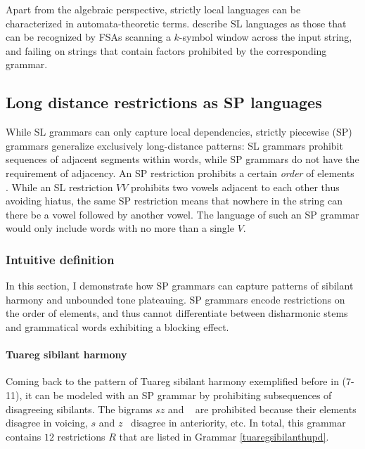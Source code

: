 Apart from the algebraic perspective, strictly local languages can be characterized in automata-theoretic terms.
\cite{RogersPullum2011} describe SL languages as those that can be recognized by FSAs scanning a $k$-symbol window across the input string, and failing on strings that contain factors prohibited by the corresponding grammar.


\subsection{Long distance restrictions as SP languages}
\label{SPldrestrictions}


While SL grammars can only capture local dependencies, strictly piecewise (SP) grammars generalize exclusively long-distance patterns: %
SL grammars prohibit sequences of adjacent segments within words, while SP grammars do not have the requirement of adjacency.
An SP restriction prohibits a certain \emph{order} of elements \citep{Rogers-HeinzEtAl-2010-LPTSS,Fu2011}. 
While an SL restriction $VV$ prohibits two vowels adjacent to each other thus avoiding hiatus, the same SP restriction means that nowhere in the string can there be a vowel followed by another vowel.
The language of such an SP grammar would only include words with no more than a single $V$.


\subsubsection{Intuitive definition}

In this section, I demonstrate how SP grammars can capture patterns of sibilant harmony and unbounded tone plateauing.
SP grammars encode restrictions on the order of elements, and thus cannot differentiate between disharmonic stems and grammatical words exhibiting a blocking effect.





\paragraph{Tuareg sibilant harmony}
Coming back to the pattern of Tuareg sibilant harmony exemplified before in (7-11), it can be modeled with an SP grammar by prohibiting subsequences of disagreeing sibilants.
The bigrams $sz$ and \textesh\textyogh~ are prohibited because their elements disagree in voicing, \textesh$s$ and $z$\textyogh~ disagree in anteriority, etc.
In total, this grammar contains $12$ restrictions $R$ that are listed in Grammar \ref{tuaregsibilanthupd}.

